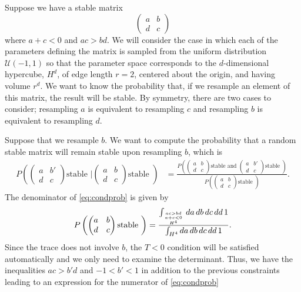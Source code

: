 \documentclass{amsart}
\theoremstyle{definition}
\theoremstyle{remark}
\numberwithin{equation}{section}
\begin{document}
Suppose we have a stable matrix
$$
\begin{pmatrix}
a & b \\
d & c
\end{pmatrix}
$$
where $a + c < 0$ and $ac > bd$. We will consider the case in which each of the parameters defining the matrix is sampled from the uniform distribution $\mathcal{U}(-1,1)$ so that the parameter space corresponds to the $d$-dimensional hypercube, $H^d$, of edge length $r=2$, centered about the origin, and having volume $r^d$.  We want to know the probability that, if we resample an element of this matrix, the result will be stable.  By symmetry, there are two cases to consider; resampling $a$ is equivalent to resampling $c$ and resampling $b$ is equivalent
to resampling $d$.

Suppose that we resample $b$.  We want to compute the probability that a random stable matrix will remain stable upon resampling $b$, which is
\begin{align}\label{eq:condprob}
P\left(\begin{pmatrix}
a & b' \\
d & c
\end{pmatrix} \textrm{stable } \bigg| \begin{pmatrix}
a & b \\
d & c
\end{pmatrix} \textrm{stable } \right)
& = \frac{P\left(\begin{pmatrix}
a & b \\
d & c
\end{pmatrix} \textrm{stable and } \begin{pmatrix}
a & b' \\
d & c
\end{pmatrix} \textrm{stable } \right)}{P\left(\begin{pmatrix}
a & b \\
d & c
\end{pmatrix} \textrm{stable } \right)}.
\end{align}
The denominator of \ref{eq:condprob} is given by
\begin{align*}
P\left(\begin{pmatrix}
a & b \\
d & c
\end{pmatrix} \textrm{stable } \right) = \frac{\int_{{ac>bd \atop a+c<0} \atop H^4} da\,db\,dc\,dd\,1}{\int_{H^4} da\,db\,dc\,dd\,1}.
\end{align*}
Since the trace does not involve $b$, the $T<0$ condition will be satisfied automatically and we only need to examine the determinant. Thus, we have the inequalities $ac > b'd$ and $-1 < b' < 1$ in addition to the previous constraints leading to an expression for the numerator of \ref{eq:condprob}
\end{document}
